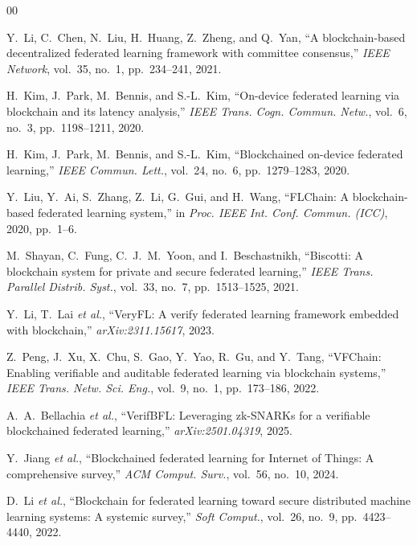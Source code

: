 \documentclass[conference]{IEEEtran}
\begin{document}

\begin{thebibliography}{00}

Y.~Li, C.~Chen, N.~Liu, H.~Huang, Z.~Zheng, and Q.~Yan,
``A blockchain-based decentralized federated learning framework with committee consensus,''
\textit{IEEE Network}, vol.~35, no.~1, pp.~234--241, 2021.

H.~Kim, J.~Park, M.~Bennis, and S.-L.~Kim,
``On-device federated learning via blockchain and its latency analysis,''
\textit{IEEE Trans. Cogn. Commun. Netw.}, vol.~6, no.~3, pp.~1198--1211, 2020.

H.~Kim, J.~Park, M.~Bennis, and S.-L.~Kim,
``Blockchained on-device federated learning,''
\textit{IEEE Commun. Lett.}, vol.~24, no.~6, pp.~1279--1283, 2020.

Y.~Liu, Y.~Ai, S.~Zhang, Z.~Li, G.~Gui, and H.~Wang,
``FLChain: A blockchain-based federated learning system,''
in \textit{Proc. IEEE Int. Conf. Commun. (ICC)}, 2020, pp.~1--6.

M.~Shayan, C.~Fung, C.~J.~M.~Yoon, and I.~Beschastnikh,
``Biscotti: A blockchain system for private and secure federated learning,''
\textit{IEEE Trans. Parallel Distrib. Syst.}, vol.~33, no.~7, pp.~1513--1525, 2021.

Y.~Li, T.~Lai \textit{et al.},
``VeryFL: A verify federated learning framework embedded with blockchain,''
\textit{arXiv:2311.15617}, 2023.

Z.~Peng, J.~Xu, X.~Chu, S.~Gao, Y.~Yao, R.~Gu, and Y.~Tang,
``VFChain: Enabling verifiable and auditable federated learning via blockchain systems,''
\textit{IEEE Trans. Netw. Sci. Eng.}, vol.~9, no.~1, pp.~173--186, 2022.

A.~A.~Bellachia \textit{et al.},
``VerifBFL: Leveraging zk-SNARKs for a verifiable blockchained federated learning,''
\textit{arXiv:2501.04319}, 2025.

Y.~Jiang \textit{et al.},
``Blockchained federated learning for Internet of Things: A comprehensive survey,''
\textit{ACM Comput. Surv.}, vol.~56, no.~10, 2024.

D.~Li \textit{et al.},
``Blockchain for federated learning toward secure distributed machine learning systems: A systemic survey,''
\textit{Soft Comput.}, vol.~26, no.~9, pp.~4423--4440, 2022.


\end{thebibliography}
\end{document}

